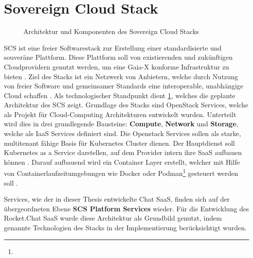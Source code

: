 \section{Sovereign Cloud Stack}
\label{sec:gaia-x-einbettung:scs}

\begin{figure}[h]
  \raggedleft
  \caption{Architektur und Komponenten des Sovereign Cloud Stacks}
  \label{fig:scs_architecture}
\end{figure}

\ac{SCS} ist eine freier Softwarestack zur Erstellung einer standardisierte und souveräne Plattform.
Diese Plattform soll von existierenden und zukünftigen Cloudprovidern genutzt werden, um eine Gaia-X konforme Infrastruktur zu bieten \cite{scs}.
Ziel des Stacks ist ein Netzwerk von Anbietern, welche durch Nutzung von freier Software und gemeinsamer Standards
eine interoperable, unabhängige Cloud schaffen \cite{Kagermann2021}.
Als technologischer Standpunkt dient \ref{fig:scs_architecture}, welches die geplante Architektur des \ac{SCS} zeigt. 
Grundlage des Stacks sind OpenStack Services, welche als Projekt für Cloud-Computing Architekturen entwickelt wurden.
Unterteilt wird dies in drei grundlegende Bausteine: \textbf{Compute}, \textbf{Network} und \textbf{Storage},
welche als \ac{IaaS} Services definiert sind.
Die Openstack Services sollen als starke, multitenant fähige Basis für Kubernetes Cluster dienen. 
Der Hauptdienst soll Kubernetes as a Service darstellen, auf dem Provider intern ihre \ac{SaaS} aufbauen können \cite{scs}.
Darauf aufbauend wird ein Container Layer erstellt, welcher mit Hilfe von Containerlaufzeitumgebungen
wie Docker oder 
Podman\footnote{}
gesteuert werden soll \cite{scs}.

Services, wie der in dieser Thesis entwickelte Chat \ac{SaaS}, finden sich auf der übergeordneten Ebene \textbf{SCS Platform Services} wieder.
Für die Entwicklung des Rocket.Chat \ac{SaaS} wurde diese Architektur als Grundbild genutzt, indem 
genannte Technologien des Stacks in der Implementierung berücksichtigt wurden.